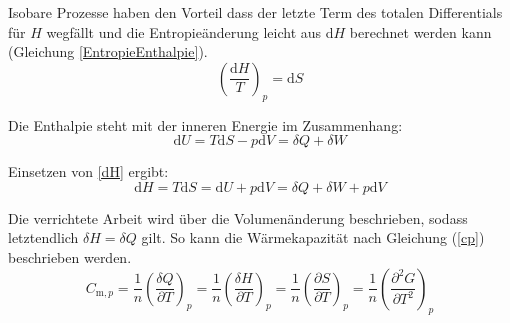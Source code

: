 \documentclass[12pt,a4paper,titlepage,headinclude,bibtotoc]{scrartcl}
\begin{document}
Isobare Prozesse haben den Vorteil dass der letzte Term des totalen Differentials für $H$ wegfällt und die Entropieänderung leicht aus d$H$ berechnet werden kann (Gleichung \ref{EntropieEnthalpie}).\\


\begin{equation} \label{EntropieEnthalpie}
\left(\frac{\mathrm{d}H}{T}\right)_p = \mathrm{d}S
\end{equation}

Die Enthalpie steht mit der inneren Energie im Zusammenhang:\\

\begin{equation}
\mathrm{d}U= T\mathrm{d}S -p\mathrm{d}V = \delta Q +\delta W
\end{equation}

Einsetzen von \ref{dH} ergibt:\\
\begin{equation}
\mathrm{d}H =T\mathrm{d}S =\mathrm{d}U+ p\mathrm{d}V = \delta Q + \delta W +p\mathrm{d}V
\end{equation}

Die verrichtete Arbeit wird über die Volumenänderung beschrieben, sodass letztendlich $\delta H = \delta Q$ gilt. So kann die Wärmekapazität nach Gleichung (\ref{cp}) beschrieben werden.\\

\begin{equation} \label{cp}
C_{\mathrm{m},p} =\frac{1}{n} \left(\frac{\delta Q}{\partial T}\right)_p =\frac{1}{n} \left(\frac{\delta H}{\partial T}\right)_p = \frac{1}{n} \left(\frac{\partial S}{\partial T}\right)_p= \frac{1}{n} \left(\frac{\partial^2 G}{\partial T^2}\right)_p
\end{equation}





\end{document}
